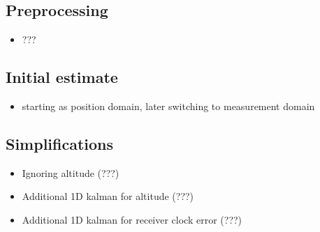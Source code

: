 \subsection{Preprocessing}
\begin{itemize}
\item ???
\end{itemize}

\subsection{Initial estimate}
\begin{itemize}
\item starting as position domain, later switching to measurement domain
\end{itemize}

\subsection{Simplifications}
\begin{itemize}
\item Ignoring altitude (???)
\item Additional 1D kalman for altitude (???)
\item Additional 1D kalman for receiver clock error (???)
\end{itemize}

